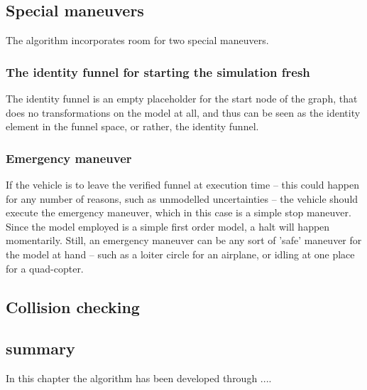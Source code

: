 \subsection{Special maneuvers}

The algorithm incorporates room for two special maneuvers.

\subsubsection{The identity funnel for starting the simulation fresh}

The identity funnel is an empty placeholder for the start node of the graph,
that does no transformations on the model at all, and thus can be seen as the
identity element in the funnel space, or rather, the identity funnel.

\subsubsection{Emergency maneuver}

If the vehicle is to leave the verified funnel at execution time -- this could
happen for any number of reasons, such as unmodelled uncertainties -- the
vehicle should execute the emergency maneuver, which in this case is a simple
stop maneuver. Since the model employed is a simple first order model, a halt
will happen momentarily. Still, an emergency maneuver can be any sort of 'safe'
maneuver for the model at hand -- such as a loiter circle for an airplane, or
idling at one place for a quad-copter.

\subsection{Collision checking}

\subsection{summary}

In this chapter the \rrtfunnel{} algorithm has been developed through ....
